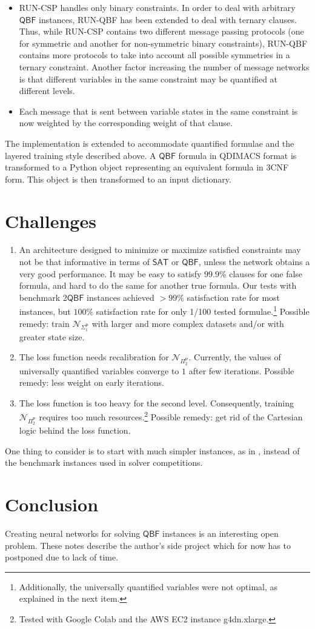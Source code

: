 \documentclass[12pt]{article}
\newcommand*{\PTIME}{\mathsf{P}}
\newcommand*{\SAT}{\mathsf{SAT}}
\newcommand*{\QBF}{\mathsf{QBF}}
\newcommand*{\RUNCSP}{\textrm{RUN-CSP}\xspace}
\newcommand*{\RUNQBF}{\textrm{RUN-QBF}\xspace}
\newcommand*{\calN}{\mathcal{N}}
\begin{document}
\begin{itemize}
\item  \RUNCSP handles only binary constraints. In order to deal with arbitrary $\QBF$ instances, \RUNQBF has been extended to deal with ternary clauses. Thus, while \RUNCSP contains two different message passing protocols (one for symmetric and another for non-symmetric binary constraints), \RUNQBF contains more protocols to take into account all possible symmetries in a ternary constraint. Another factor increasing the number of message networks is that different variables in the same constraint may be quantified at different levels.
\item Each message that is sent between variable states in the same constraint is now weighted by the corresponding weight of that clause.
\end{itemize}
The implementation is extended to accommodate quantified formulae and the layered training style described above. A $\QBF$ formula in QDIMACS format is transformed to a Python object representing an equivalent formula in 3CNF form. This object is then transformed to an input dictionary.

\section{Challenges}
\begin{enumerate}
\item An architecture designed to minimize or maximize satisfied constraints may not be that informative in terms of $\SAT$ or $\QBF$, unless the network obtains a very good performance. It may be easy to satisfy $99.9 \%$ clauses for one false formula, and hard to do the same for another true formula. Our tests with benchmark 2$\QBF$ instances achieved $>99\%$ satisfaction rate for most instances, but $100\%$ satisfaction rate for only 1/100 tested formulae.\footnote{Additionally, the universally quantified variables were not optimal, as explained in the next item.} Possible remedy: train $\calN_{\Sigma^\PTIME_1}$ with larger and more complex datasets and/or with greater state size. 
\item The loss function needs recalibration for $\calN_{\Pi^\PTIME_2}$. Currently, the values of universally quantified variables converge to $1$ after few iterations. Possible remedy: less weight on early iterations.
\item The loss function is too heavy for the second level.  Consequently, training $\calN_{\Pi^\PTIME_2}$ requires too much resources.\footnote{Tested with Google Colab and the AWS  EC2 instance g4dn.xlarge.} Possible remedy: get rid of the Cartesian logic behind the loss function. 
\end{enumerate}
One thing to consider is to start with much simpler instances, as in \cite{abs-2101-06619}, instead of the benchmark instances used in solver competitions.

\section{Conclusion}
Creating neural networks for solving $\QBF$ instances is an interesting open problem. These notes describe the author's side project which for now has to postponed due to lack of time.



\end{document}
